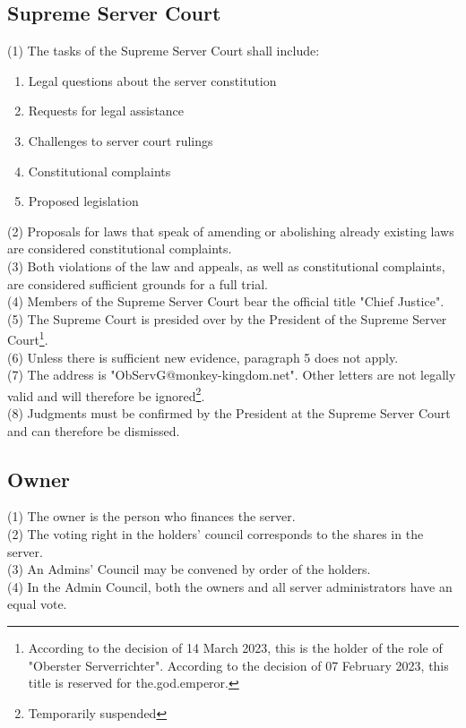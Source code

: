 \documentclass{article}
\begin{document}
\subsection{Supreme Server Court}
(1) The tasks of the Supreme Server Court shall include:
\begin{enumerate}
    \item Legal questions about the server constitution
    \item Requests for legal assistance
    \item Challenges to server court rulings
    \item Constitutional complaints
    \item Proposed legislation
\end{enumerate}
(2) Proposals for laws that speak of amending or abolishing already existing laws are considered constitutional complaints.\\
(3) Both violations of the law and appeals, as well as constitutional complaints, are considered sufficient grounds for a full trial.\\
(4) Members of the Supreme Server Court bear the official title "Chief Justice".\\
(5) The Supreme Court is presided over by the President of the Supreme Server Court\footnote{According to the decision of 14 March 2023, this is the holder of the role of "Oberster Serverrichter". According to the decision of 07 February 2023, this title is reserved for the.god.emperor.}.\\
(6) Unless there is sufficient new evidence, paragraph 5 does not apply.\\
(7) The address is "ObServG@monkey-kingdom.net". Other letters are not legally valid and will therefore be ignored\footnote{Temporarily suspended}.\\
(8) Judgments must be confirmed by the President at the Supreme Server Court and can therefore be dismissed.

\subsection{Owner}
(1) The owner is the person who finances the server.\\
(2) The voting right in the holders' council corresponds to the shares in the server.\\
(3) An Admins' Council may be convened by order of the holders.\\
(4) In the Admin Council, both the owners and all server administrators have an equal vote.\\
\end{document}
